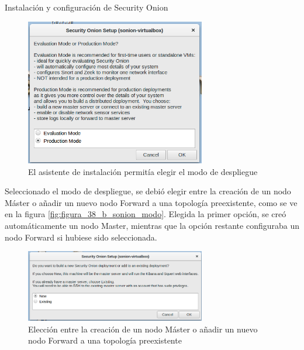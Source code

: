 \begin{section}{Instalación y configuración de Security Onion}
        \begin{figure}[H]
            \centering
            \includegraphics[width=0.7\textwidth]{./iteracion_1_imagenes/figura_38_sonion_modo.png}
            \caption{El asistente de instalación permitía elegir el modo de despliegue}
            \label{fig:figura_38_sonion_modo}
        \end{figure}
        \FloatBarrier
        Seleccionado el modo de despliegue, se debió elegir entre la creación de un nodo Máster o añadir un nuevo nodo Forward a una topología preexistente, como se ve en la figura \ref{fig:figura_38_b_sonion_modo}. Elegida la primer opción, se creó automáticamente un nodo Master, mientras que la opción restante configuraba un nodo Forward si hubiese sido seleccionada. \par
        \begin{figure}[H]
            \centering
            \includegraphics[width=0.7\textwidth]{./iteracion_1_imagenes/figura_38_b_sonion_modo.png}
            \caption{Elección entre la creación de un nodo Máster o añadir un nuevo nodo Forward a una topología preexistente}

\end{figure}
\end{section}
